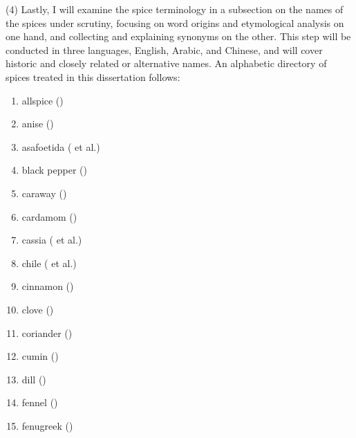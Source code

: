 (4) Lastly, I will examine the spice terminology in a subsection on the names of the spices under scrutiny, focusing on word origins and etymological analysis on one hand, and collecting and explaining synonyms on the other. This step will be conducted in three languages, English, Arabic, and Chinese, and will cover historic and closely related or alternative names. An alphabetic directory of spices treated in this dissertation follows:


\clearpage

\begin{multicols}{2}
\begin{enumerate}
    \item allspice () \quad \hfill  \pageref{sec:allspice}
    \item anise () \quad \hfill \pageref{sec:anise}
    \item asafoetida ( et al.) \quad \hfill \pageref{sec:asafoetida}
	\item black pepper () \quad \hfill \pageref{sec:pepper}
    \item caraway () \quad \hfill \pageref{sec:caraway}
    \item cardamom () \quad \hfill \pageref{sec:cardamom}
    \item cassia ( et al.) \quad \hfill \pageref{sec:cassia}
    \item chile ( et al.) \quad \hfill \pageref{sec:chile}
    \item cinnamon () \quad \hfill \pageref{sec:cinnamon}
    \item clove () \quad \hfill \pageref{sec:clove}
    \item coriander () \quad \hfill \pageref{sec:coriander}
    \item cumin () \quad \hfill \pageref{sec:cumin}
    \item dill () \quad \hfill \pageref{sec:dill}
    \item fennel () \quad \hfill \pageref{sec:fennel}
    \item fenugreek () \quad \hfill \pageref{sec:fenugreek}

\end{enumerate}
\end{multicols}
